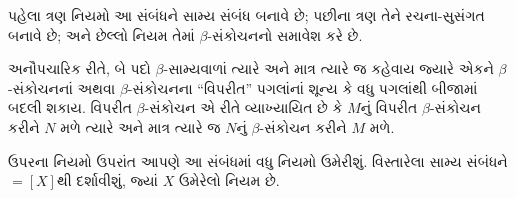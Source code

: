 \documentclass[../../../include/open-logic-section]{subfiles}
\begin{document}
પહેલા ત્રણ નિયમો આ સંબંધને સામ્ય સંબંધ બનાવે છે;
પછીના ત્રણ તેને રચના-સુસંગત બનાવે છે; અને છેલ્લો નિયમ
તેમાં $\beta$-સંકોચનનો સમાવેશ કરે છે.

અનૌપચારિક રીતે, બે પદો $\beta$-સામ્યવાળાં ત્યારે અને
માત્ર ત્યારે જ કહેવાય જ્યારે એકને $\beta$-સંકોચનનાં
અથવા $\beta$-સંકોચનના ``વિપરીત'' પગલાંનાં શૂન્ય કે
વધુ પગલાંથી બીજામાં બદલી શકાય. વિપરીત $\beta$-સંકોચન
એ રીતે વ્યાખ્યાયિત છે કે $M$નું વિપરીત $\beta$-સંકોચન કરીને
$N$ મળે ત્યારે અને માત્ર ત્યારે જ $N$નું $\beta$-સંકોચન
કરીને $M$ મળે.

ઉપરના નિયમો ઉપરાંત આપણે આ સંબંધમાં વધુ નિયમો ઉમેરીશું.
વિસ્તારેલા સામ્ય સંબંધને $\equal[X]$થી દર્શાવીશું,
જ્યાં $X$ ઉમેરેલો નિયમ છે.
\end{document}
